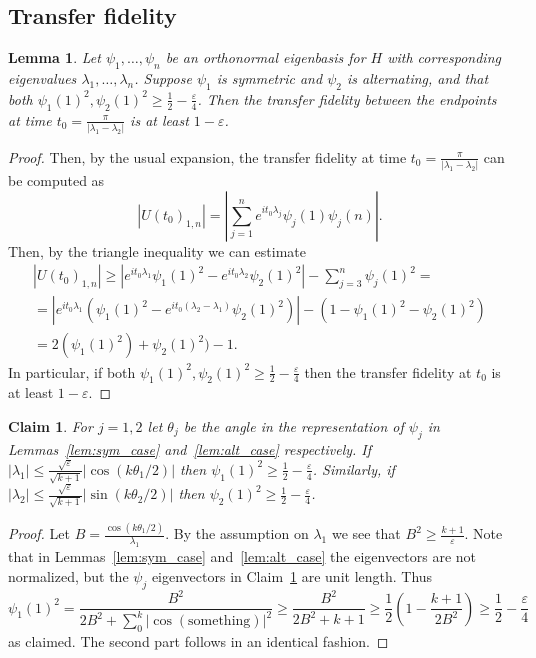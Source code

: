 \documentclass{article}
\newtheorem{lemma}[theorem]{Lemma}
\newtheorem{claim}[theorem]{Claim}
\theoremstyle{definition}
\numberwithin{equation}{section}
\numberwithin{theorem}{section}
\newcommand{\ep}{\varepsilon}
\begin{document}
\subsection{Transfer fidelity}

\begin{lemma}\label{lem:transfer_fidelity}
    Let $\psi_1, \dots, \psi_n$ be an orthonormal eigenbasis for $H$ with corresponding eigenvalues $\lambda_1, \dots, \lambda_n$. Suppose $\psi_1$ is symmetric and $\psi_2$ is alternating, and that both $\psi_1(1)^2, \psi_2(1)^2 \geq \tfrac{1}{2}-\tfrac{\ep}{4}$. Then the transfer fidelity between the endpoints at time $t_0 = \tfrac{\pi}{|\lambda_1-\lambda_2|}$ is at least $1-\ep$.
\end{lemma}

\begin{proof}
 Then, by the usual expansion, the transfer fidelity at time $t_0 = \tfrac{\pi}{|\lambda_1-\lambda_2|}$ can be computed as 
\[ |U(t_0)_{1,n}| = \left|\sum_{j=1}^n e^{it_0 \lambda_j} \psi_j(1) \psi_j(n)\right|.\]
 Then, by the triangle inequality we can estimate
\begin{multline*}
    |U(t_0)_{1,n}| \geq \left|e^{it_0 \lambda_1} \psi_1(1)^2 - e^{it_0 \lambda_2} \psi_2(1)^2\right| - \sum_{j=3}^n \psi_j(1)^2 =\\= \left| e^{it_0 \lambda_1}\left(\psi_1(1)^2 - e^{i t_0 (\lambda_2-\lambda_1)} \psi_2(1)^2\right)\right| - (1-\psi_1(1)^2-\psi_2(1)^2) \\ =2(\psi_1(1)^2)+\psi_2(1)^2)-1.
\end{multline*}
In particular, if both $\psi_1(1)^2, \psi_2(1)^2 \geq \tfrac{1}{2}-\tfrac{\ep}{4}$ then the transfer fidelity at $t_0$ is at least $1-\ep$.
\end{proof}

\begin{claim}\label{cl:psi_bound}
    For $j=1,2$ let $\theta_j$ be the angle in the representation of $\psi_j$ in Lemmas~\ref{lem:sym_case} and~\ref{lem:alt_case}  respectively. If $|\lambda_1| \leq \tfrac{\sqrt{\ep}}{\sqrt{k+1}} |\cos(k\theta_1/2)|$ then $\psi_1(1)^2 \geq \tfrac{1}{2}-\tfrac{\ep}{4}$. Similarly, if $|\lambda_2| \leq \tfrac{\sqrt{\ep}}{\sqrt{k+1}} |\sin(k\theta_2/2)|$ then $\psi_2(1)^2 \geq \tfrac{1}{2}-\tfrac{\ep}{4}$.
\end{claim}

\begin{proof}
     Let $B = \tfrac{\cos(k \theta_1/2)}{\lambda_1}$. By the assumption on $\lambda_1$ we see that $B^2 \geq \tfrac{k+1}{\ep}$. Note that in Lemmas~\ref{lem:sym_case} and~\ref{lem:alt_case} the eigenvectors are not normalized, but the $\psi_j$ eigenvectors in Claim~\ref{cl:psi_bound} are unit length. Thus 
    \[\psi_1(1)^2 = \frac{B^2}{2B^2 + \sum_0^k |\cos(\mbox{something})|^2}\geq \frac{B^2}{2B^2+k+1} \geq \frac{1}{2} \left( 1 - \frac{k+1}{2B^2}\right)\geq \frac{1}{2} - \frac{\ep}{4}\] as claimed. The second part follows in an identical fashion.
\end{proof}
\end{document}
